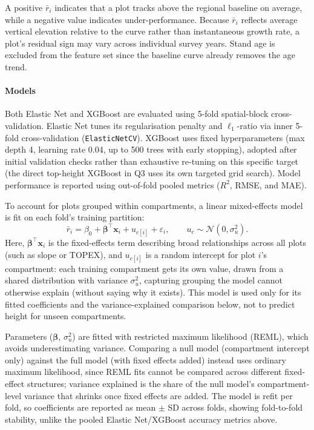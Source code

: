\documentclass[logo,msc,ai]{infthesis}           %
\begin{document}
A positive $\bar{r}_i$ indicates that a plot tracks above the regional baseline on average, while a negative value indicates under-performance. Because $\bar{r}_i$ reflects average vertical elevation relative to the curve rather than instantaneous growth rate, a plot's residual sign may vary across individual survey years. Stand age is excluded from the feature set since the baseline curve already removes the age trend.

\paragraph*{Models} Both Elastic Net and XGBoost are evaluated using 5-fold spatial-block cross-validation. Elastic Net tunes its regularisation penalty and $\ell_1$-ratio via inner 5-fold cross-validation (\texttt{ElasticNetCV}). XGBoost uses fixed hyperparameters (max depth 4, learning rate 0.04, up to 500 trees with early stopping), adopted after initial validation checks rather than exhaustive re-tuning on this specific target (the direct top-height XGBoost in Q3 uses its own targeted grid search). Model performance is reported using out-of-fold pooled metrics ($R^2$, RMSE, and MAE).

To account for plots grouped within compartments, a linear mixed-effects model is fit on each fold's training partition:
\begin{equation}
\bar{r}_i = \beta_0 + \boldsymbol{\beta}^{\top}\mathbf{x}_i + u_{c[i]} + \varepsilon_i, \qquad u_c \sim \mathcal{N}(0, \sigma_u^2).
\label{eq:mixed-effects}
\end{equation}
Here, $\boldsymbol{\beta}^{\top}\mathbf{x}_i$ is the fixed-effects term describing broad relationships across all plots (such as slope or TOPEX), and $u_{c[i]}$ is a random intercept for plot $i$'s compartment: each training compartment gets its own value, drawn from a shared distribution with variance $\sigma_u^2$, capturing grouping the model cannot otherwise explain (without saying why it exists). This model is used only for its fitted coefficients and the variance-explained comparison below, not to predict height for unseen compartments.

Parameters ($\boldsymbol{\beta}$, $\sigma_u^2$) are fitted with restricted maximum likelihood (REML), which avoids underestimating variance. Comparing a null model (compartment intercept only) against the full model (with fixed effects added) instead uses ordinary maximum likelihood, since REML fits cannot be compared across different fixed-effect structures; variance explained is the share of the null model's compartment-level variance that shrinks once fixed effects are added. The model is refit per fold, so coefficients are reported as mean $\pm$ SD across folds, showing fold-to-fold stability, unlike the pooled Elastic Net/XGBoost accuracy metrics above.
\end{document}
